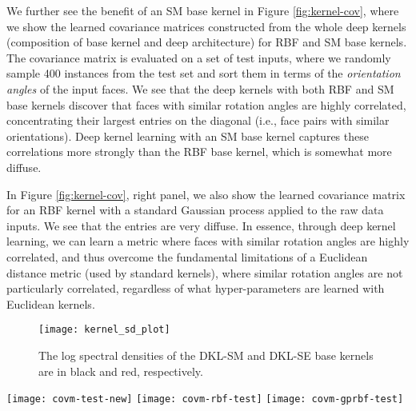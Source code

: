 \documentclass[twoside,11pt]{article}
\begin{document}
We further see the benefit of an SM base kernel in Figure \ref{fig:kernel-cov}, where we show the learned covariance matrices constructed from the whole deep kernels (composition of base kernel and deep architecture) for RBF and SM base kernels.  The covariance matrix is evaluated on a set of test inputs, where we randomly sample 400 instances from the test set and sort them in terms of the {\it orientation angles} of the input faces.
We see that the deep kernels with both RBF and SM base kernels discover that faces with similar rotation angles are highly correlated, concentrating their largest entries on the diagonal (i.e., face pairs with similar orientations). Deep kernel learning with an SM base kernel captures these correlations more strongly than the RBF base kernel, which is somewhat more diffuse.

In Figure \ref{fig:kernel-cov}, right panel, we also show the learned covariance matrix for an RBF kernel with a standard Gaussian process applied to the raw data inputs.
We see that the entries are very diffuse.  In essence, through deep kernel learning, we can learn a metric where faces with similar rotation angles are highly correlated, and thus overcome the fundamental limitations of a Euclidean distance metric (used by standard kernels), where similar rotation angles are not particularly correlated, regardless of what hyper-parameters are learned with Euclidean kernels.

\begin{figure}[t!]

\centering
\texttt{[image: kernel\_sd\_plot]}

  \caption{\small The log spectral densities of the DKL-SM and DKL-SE base kernels are in black and red, respectively.}
  \label{fig:kernel-lsd}

\end{figure}

\begin{figure*}[t!]

\centering
  \subfigure
  {\texttt{[image: covm-test-new]}}
  \subfigure
  {\texttt{[image: covm-rbf-test]}}
  \subfigure
  {\texttt{[image: covm-gprbf-test]}}

  \caption{\small {\bf Left}:
The induced covariance matrix using  DKL-SM kernel
on a set of test cases, where the test samples are ordered according to the {\it orientations} of the input faces. {\bf Middle}: The respective covariance matrix using DKL-RBF kernel. {\bf Right}:
The respective covariance matrix using regular RBF kernel.
The models are trained with $n=12,000$. We set $Q=4$ for the SM base kernel.}

\label{fig:kernel-cov}
\end{figure*}
\end{document}

